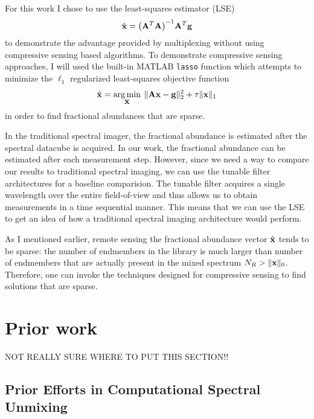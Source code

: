 For this work I chose to use the least-squares estimator (LSE)
%
\begin{equation}
	\mbh{x} = \ap{ \mb{A}^T \mb{A} }^{-1} \mb{A}^T \mb{g}
\end{equation}\label{eq:lseEquationChap5}
%
to demonstrate the advantage provided by multiplexing without using compressive sensing based algorithms. To demonstrate compressive sensing approaches, I will used the built-in MATLAB \texttt{lasso} function which attempts to minimize the $\ell_1$ regularized least-squares objective function 
%
\begin{equation}
	\hat{ \displaystyle \mathbf{x} } = \operatorname*{arg\,min}_{\displaystyle \mathbf{x}} \: \| \displaystyle \mathbf{Ax} - \displaystyle \mathbf{g} \|_{2}^{2} + \tau \| \displaystyle \mathbf{x} \|_1
	\label{eq:l1reglsV2}
\end{equation}
%
in order to find fractional abundances that are sparse. 

In the traditional spectral imager, the fractional abundance is estimated after the spectral datacube is acquired. In our work, the fractional abundance can be estimated after each measurement step. However, since we need a way to compare our results to traditional spectral imaging, we can use the tunable filter architectures for a baseline comparision. The tunable filter acquires a single wavelength over the entire field-of-view and thus allows us to obtain measurements in a time sequential manner. This means that we can use the LSE to get an idea of how a traditional spectral imaging architecture would perform.

As I mentioned earlier, remote sensing the fractional abundance vector $\hat{ \displaystyle \mathbf{x} }$ tends to be sparse: the number of endmembers in the library is much larger than number of endmembers that are actually present in the mixed spectrum $N_{R} > \| \displaystyle \mathbf{x} \|_0$. Therefore, one can invoke the techniques designed for compressive sensing to find solutions that are sparse.

\section{Prior work}

NOT REALLY SURE WHERE TO PUT THIS SECTION!!

\subsection{Prior Efforts in Computational Spectral Unmixing}

